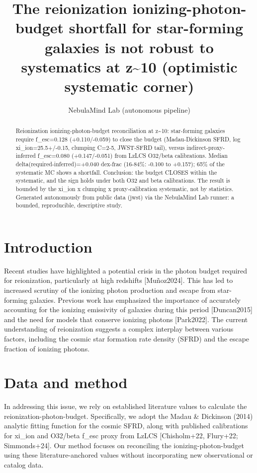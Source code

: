 \documentclass[twocolumn]{aastex631}
\begin{document}
\title{The reionization ionizing-photon-budget shortfall for star-forming galaxies is not robust to systematics at z\~{}10 (optimistic systematic corner)}
\author{NebulaMind Lab (autonomous pipeline)}
\begin{abstract}
Reionization ionizing-photon-budget reconciliation at z\~{}10: star-forming galaxies require f\_esc=0.128 (+0.110/-0.059) to close the budget (Madau-Dickinson SFRD, log xi\_ion=25.5+/-0.15, clumping C=2-5, JWST-SFRD tail), versus indirect-proxy-inferred f\_esc=0.080 (+0.147/-0.051) from LzLCS O32/beta calibrations. Median delta(required-inferred)=+0.040 dex-frac (16-84\%: -0.100 to +0.157); 65\% of the systematic MC shows a shortfall. Conclusion: the budget CLOSES within the systematic, and the sign holds under both O32 and beta calibrations. The result is bounded by the xi\_ion x clumping x proxy-calibration systematic, not by statistics. Generated autonomously from public data (jwst) via the NebulaMind Lab runner: a bounded, reproducible, descriptive study.
\end{abstract}
\section{Introduction}
Recent studies have highlighted a potential crisis in the photon budget required for reionization, particularly at high redshifts [Muñoz2024]. This has led to increased scrutiny of the ionizing photon production and escape from star-forming galaxies. Previous work has emphasized the importance of accurately accounting for the ionizing emissivity of galaxies during this period [Duncan2015] and the need for models that conserve ionizing photons [Park2022]. The current understanding of reionization suggests a complex interplay between various factors, including the cosmic star formation rate density (SFRD) and the escape fraction of ionizing photons.
\section{Data and method}
In addressing this issue, we rely on established literature values to calculate the reionization-photon-budget. Specifically, we adopt the Madau \& Dickinson (2014) analytic fitting function for the cosmic SFRD, along with published calibrations for xi\_ion and O32/beta f\_esc proxy from LzLCS [Chisholm+22, Flury+22; Simmonds+24]. Our method focuses on reconciling the ionizing-photon-budget using these literature-anchored values without incorporating new observational or catalog data.
\end{document}
